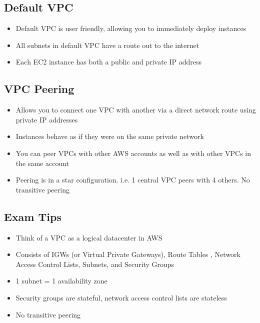 \documentclass{article}
\begin{document}
\subsection{Default VPC}
\begin{itemize}
\item
Default VPC is user friendly, allowing you to immediately deploy instances

\item
All subnets in default VPC have a route out to the internet

\item
Each EC2 instance has both a public and private IP address

\end{itemize}

\subsection{VPC Peering}
\begin{itemize}
\item
Allows you to connect one VPC with another via a direct network route using private IP addresses

\item
Instances behave as if they were on the same private network

\item
You can peer VPCs with other AWS accounts as well as with other VPCs in the same account

\item
Peering is in a star configuration. i.e. 1 central VPC peers with 4 others. No transitive peering

\end{itemize}

\subsection{Exam Tips}

\begin{itemize}
\item
Think of a VPC as a logical datacenter in AWS

\item
Consists of IGWs (or Virtual Private Gateways), Route Tables , Network Access Control Lists, Subnets, and Security Groups

\item
1 subnet = 1 availability zone

\item
Security groups are stateful, network access control lists are stateless

\item
No transitive peering


\end{itemize}
\end{document}
